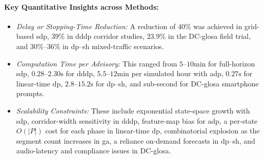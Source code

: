 \paragraph{Key Quantitative Insights across Methods:}
\begin{itemize}
    \item \emph{Delay or Stopping-Time Reduction:} A reduction of $40\%$ was achieved in grid-based \ac{sdp}, $39\%$ in \ac{dddp} corridor studies, $23.9\%$ in the DC-\ac{glosa} field trial, and $30\%$--$36\%$ in \ac{dp}–\ac{sh} mixed-traffic scenarios.
    \item \emph{Computation Time per Advisory:} This ranged from $5$--$10\unit{\minute}$ for full-horizon \ac{sdp}, $0.28$--$2.30\unit{\second}$ for \ac{dddp}, $5.5$--$12\unit{\minute}$ per simulated hour with \ac{adp}, $0.27\unit{\second}$ for linear-time \ac{dp}, $2.8$--$15.2\unit{\second}$ for \ac{dp}–\ac{sh}, and sub-second for DC-\ac{glosa} smartphone prompts.
    \item \emph{Scalability Constraints:} These include exponential state-space growth with \ac{sdp}, corridor-width sensitivity in \ac{dddp}, feature-map bias for \ac{adp}, a per-state $O(|P|)$ cost for each phase in linear-time \ac{dp}, combinatorial explosion as the segment count increases in \ac{ga}, a reliance on-demand forecasts in \ac{dp}–\ac{sh}, and audio-latency and compliance issues in DC-\ac{glosa}.
\end{itemize}

